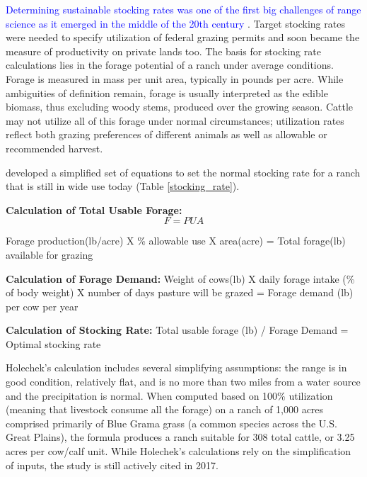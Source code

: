 \documentclass[11pt]{article}
\begin{document}
\textcolor{blue}{Determining sustainable stocking rates was one of the first big challenges of range science as it emerged in the middle of the 20th century} \citep{Bement1969, Harlan1958, Thomas2015, Paterson2012, Reppert1960, Fleischner1994}. Target stocking rates were needed to specify utilization of federal grazing permits and soon became the measure of productivity on private lands too. The basis for stocking rate calculations lies in the forage potential of a ranch under average conditions.
Forage is measured in mass per unit area, typically in pounds per acre. While ambiguities of definition remain, forage is usually interpreted as the edible biomass, thus excluding woody stems, produced over the growing season. 
Cattle may not utilize all of this forage under normal circumstances; utilization rates reflect both grazing preferences of different animals as well as allowable or recommended harvest. 

\citet{Holechek1988} developed a simplified set of equations to set the normal stocking rate for a ranch that is still in wide use today (Table \ref{stocking_rate}).

\textbf{Calculation of Total Usable Forage:}
\begin{equation}
F = P U A
\end{equation}

Forage production(lb/acre) X \% allowable use X area(acre) = Total forage(lb) available for grazing

\textbf{Calculation of Forage Demand:}
Weight of cows(lb) X daily forage intake (\% of body weight) X number of days pasture will be grazed = Forage demand (lb) per cow per year

\textbf{Calculation of Stocking Rate:}
Total usable forage (lb) / Forage Demand = Optimal stocking rate

Holechek’s calculation includes several simplifying assumptions: the range is in good condition, relatively flat, and is no more than two miles from a water source and the precipitation is normal. When computed based on 100\% utilization (meaning that livestock consume all the forage)
 on a ranch of 1,000 acres comprised primarily of Blue Grama grass (a common species across the U.S. Great Plains), the formula produces a ranch suitable for 308 total cattle, or 3.25 acres per cow/calf unit. While Holechek’s calculations rely on the simplification of inputs, the study is still actively cited in 2017.
\end{document}
